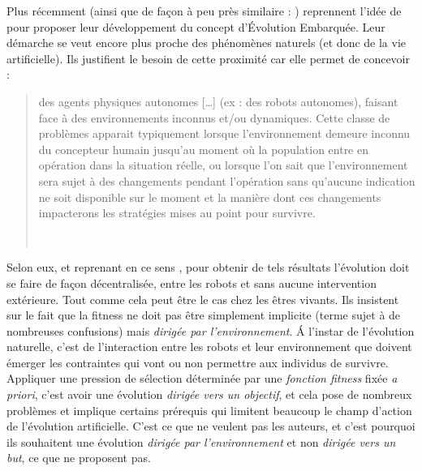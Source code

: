 Plus récemment \cite{bredeche11mcmds} (ainsi que de façon à peu près similaire : \cite{trueba11taskdrivenspeciesevolutionaryroboticteams}) reprennent l'idée de \cite{watson02embodiedevolutiondistributingevolutionaryalgorithmpopulationrobots} pour proposer leur développement du concept d'\'Evolution Embarquée. Leur démarche se veut encore plus proche des phénomènes naturels (et donc de la vie artificielle). Ils justifient le besoin de cette proximité car elle permet de concevoir :

\begin{quotation}

   des agents physiques autonomes [\dots] (ex : des robots autonomes), faisant face à des environnements inconnus et/ou dynamiques. Cette classe de problèmes apparait typiquement lorsque l'environnement demeure inconnu du concepteur humain jusqu'au moment où la population entre en opération dans la situation réelle, ou lorsque l'on sait que l'environnement sera sujet à des changements pendant l'opération sans qu'aucune indication ne soit disponible sur le moment et la manière dont ces changements impacterons les stratégies mises au point pour survivre.

   \\\citep[p.1]{bredeche11mcmds}

\end{quotation}

Selon eux, et reprenant en ce sens \cite{watson02embodiedevolutiondistributingevolutionaryalgorithmpopulationrobots}, pour obtenir de tels résultats l'évolution doit se faire de façon décentralisée, entre les robots et sans aucune intervention extérieure. Tout comme cela peut être le cas chez les êtres vivants. Ils insistent sur le fait que la fitness ne doit pas être simplement implicite (terme sujet à de nombreuses confusions) mais \emph{dirigée par l'environnement}. \'A l'instar de l'évolution naturelle, c'est de l'interaction entre les robots et leur environnement que doivent émerger les contraintes qui vont ou non permettre aux individus de survivre. Appliquer une pression de sélection déterminée par une \emph{fonction fitness} fixée \emph{a priori}, c'est avoir une évolution \emph{dirigée vers un objectif}, et cela pose de nombreux problèmes et implique certains prérequis qui limitent beaucoup le champ d'action de l'évolution artificielle. C'est ce que ne veulent pas les auteurs, et c'est pourquoi ils souhaitent une évolution \emph{dirigée par l'environnement} et non \emph{dirigée vers un but},  ce que \cite{watson02embodiedevolutiondistributingevolutionaryalgorithmpopulationrobots} ne proposent pas.


